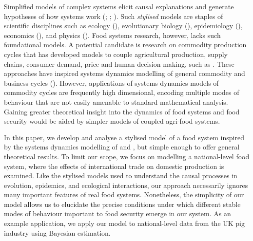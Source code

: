 \documentclass[12pt]{article}
\begin{document}
Simplified models of complex systems elicit causal explanations and generate hypotheses of how systems work (\cite{smaldino2017}; \cite{smaldino2019}; \cite{otto2020}). Such \textit{stylised} models are staples of scientific disciplines such as ecology (\cite{may1973}), evolutionary biology (\cite{boyd2003}), epidemiology (\cite{kermack1927}), economics (\cite{nerlove1958}), and physics (\cite{strogatz1994}). Food systems research, however, lacks such foundational models. A potential candidate is research on commodity production cycles that has developed models to couple agricultural production, supply chains, consumer demand, price and human decision-making, such as \textcite{meadows1971}. These approaches have inspired systems dynamics modelling of general commodity and business cycles (\cite{sterman2000}). However, applications of systems dynamics models of commodity cycles are frequently high dimensional, encoding multiple modes of behaviour that are not easily amenable to standard mathematical analysis. Gaining greater theoretical insight into the dynamics of food systems and food security would be aided by simpler models of coupled agri-food systems.

In this paper, we develop and analyse a stylised model of a food system inspired by the systems dynamics modelling of \textcite{meadows1971} and \cite{sterman2000}, but simple enough to offer general theoretical results. To limit our scope, we focus on modelling a national-level food system, where the effects of international trade on domestic production is examined. Like the stylised models used to understand the causal processes in evolution, epidemics, and ecological interactions, our approach necessarily ignores many important features of real food systems. Nonetheless, the simplicity of our model allows us to elucidate the precise conditions under which different stable modes of behaviour important to food security emerge in our system. As an example application, we apply our model to national-level data from the UK pig industry using Bayesian estimation.
\end{document}
